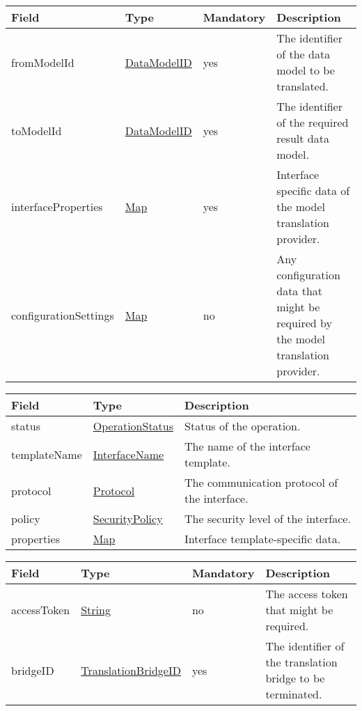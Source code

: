 \documentclass[a4paper]{arrowhead}
\newcommand{\pref}[1]{{\textcolor{ArrowheadGrey}{\hyperref[sec:model:primitives:#1]{#1}}}}
\begin{document}
\clearpage


\begin{table}[ht!]
\begin{tabularx}{\textwidth}{| p{3.3cm} | p{3cm} | p{2cm} | X |} \hline
\rowcolor{gray!33} Field & Type & Mandatory & Description \\ \hline
fromModelId & \pref{DataModelID} & yes & The identifier of the data model to be translated. \\ \hline
toModelId & \pref{DataModelID} & yes & The identifier of the required result data model. \\ \hline
interfaceProperties &\hyperref[sec:model:Map]{Map} & yes & Interface specific data of the model translation provider. \\ \hline
configurationSettings & \hyperref[sec:model:Map]{Map}  & no & Any configuration data that might be required by the model translation provider. \\ \hline
\end{tabularx}
\end{table}

 
\begin{table}[ht!]
\begin{tabularx}{\textwidth}{| p{2.5cm} | p{3cm} | X |} \hline
\rowcolor{gray!33} Field & Type & Description \\ \hline
status & \pref{OperationStatus} & Status of the operation. \\ \hline
templateName & \pref{InterfaceName} & The name of the interface template. \\ \hline
protocol & \pref{Protocol} & The communication protocol of the interface.  \\ \hline
policy & \pref{SecurityPolicy} & The security level of the interface. \\ \hline
properties &\hyperref[sec:model:Map]{Map} & Interface template-specific data. \\ \hline
\end{tabularx}
\end{table}

 
\begin{table}[ht!]
\begin{tabularx}{\textwidth}{| p{3cm} | p{4.9cm} | p{2cm} | X |} \hline
\rowcolor{gray!33} Field & Type & Mandatory & Description \\ \hline
accessToken & \pref{String} & no & The access token that might be required. \\ \hline
bridgeID & \pref{TranslationBridgeID} & yes & The identifier of the translation bridge to be terminated. \\ \hline
\end{tabularx}
\end{table}
\end{document}
